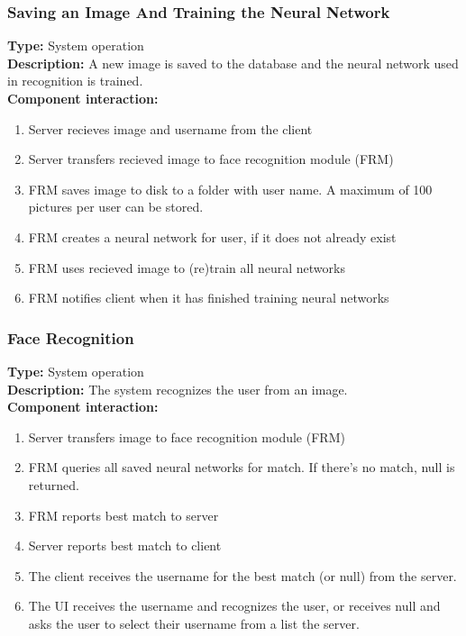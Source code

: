 \documentclass[11pt]{article}
\begin{document}
\subsubsection{Saving an Image And Training the Neural Network}
\label{sec:add-train}
\textbf{Type:} System operation\\
\textbf{Description:} A new image is saved to the database and the neural network
used in recognition is trained.\\
\textbf{Component interaction:}
\begin{enumerate}
\item{Server recieves image and username from the client}
\item{Server transfers recieved image to face recognition module (FRM)}
\item{FRM saves image to disk to a folder with user name. A maximum of 100 pictures per user can be stored.}
\item{FRM creates a neural network for user, if it does not already exist}
\item{FRM uses recieved image to (re)train all neural networks}
\item{FRM notifies client when it has finished training neural networks}
\end{enumerate}

\subsubsection{Face Recognition}
\label{sec:recognition}
\textbf{Type:} System operation\\
\textbf{Description:} The system recognizes the user from an image.\\
\textbf{Component interaction:}
\begin{enumerate}
\item{Server transfers image to face recognition module (FRM)}
\item{FRM queries all saved neural networks for match. If there's no match, null is returned.}
\item{FRM reports best match to server}
\item{Server reports best match to client}
\item{The client receives the username for the best match (or null) from the server.}
\item{The UI receives the username and recognizes the user, or receives null and asks the user to select their username from a list the server.}
\end{enumerate}
\end{document}
